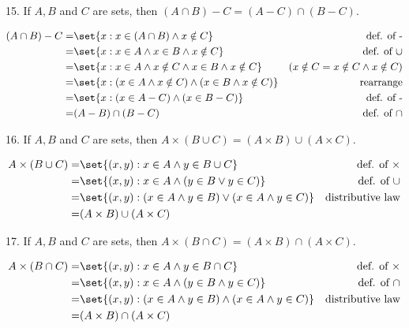 \documentclass{hippoidC}
\begin{document}
\begin{prooflist}{15. If $A, B$ and $C$ are sets, then $(A \cap B)-C=(A-C) \cap(B-C)$.}
	\item
	\begin{align*}
		(A\cap B) - C = & \set{x: x\in (A\cap B) \land x\notin C}                          & \text{def. of -}                         \\
		=               & \set{x: x\in A \land x \in B \land x\notin C}                    & \text{def. of $\cup$}                    \\
		=               & \set{x: x\in A \land x\notin C \land x\in B \land x\notin C}     & (x\notin C = x\notin C \land x \notin C) \\
		=               & \set{x: (x\in A \land x\notin C) \land (x\in B \land x\notin C)} & \text{rearrange}                         \\
		=               & \set{x: (x\in A  - C) \land (x\in B - C)}                        & \text{def. of -}                         \\
		=               & (A - B) \cap (B-C)                                               & \text{def. of }\cap
	\end{align*}
\end{prooflist}

\begin{prooflist}{16. If $A, B$ and $C$ are sets, then $A \times(B \cup C)=(A \times B) \cup(A \times C)$.}
	\item
	\begin{align*}
		A\times (B\cup C) = & \set{(x, y): x\in A \land y\in B\cup C}                        & \text{def. of }\times \\
		=                   & \set{(x,y): x\in A \land (y \in B \lor y\in C)}                & \text{def. of $\cup$} \\
		=                   & \set{(x,y): (x\in A \land y \in B) \lor (x\in A \land y\in C)} &
		\text{distributive law}                                                                                      \\
		=                   & (A\times B) \cup (A\times C)
	\end{align*}
\end{prooflist}

\begin{prooflist}{17. If $A, B$ and $C$ are sets, then $A \times(B \cap C)=(A \times B) \cap(A \times C)$.}
	\item
	\begin{align*}
		A\times (B\cap C) = & \set{(x, y): x\in A \land y\in B\cap C}                         & \text{def. of }\times \\
		=                   & \set{(x,y): x\in A \land (y \in B \land y\in C)}                & \text{def. of $\cap$} \\
		=                   & \set{(x,y): (x\in A \land y \in B) \land (x\in A \land y\in C)} &
		\text{distributive law}                                                                                       \\
		=                   & (A\times B) \cap (A\times C)
	\end{align*}
\end{prooflist}
\end{document}
